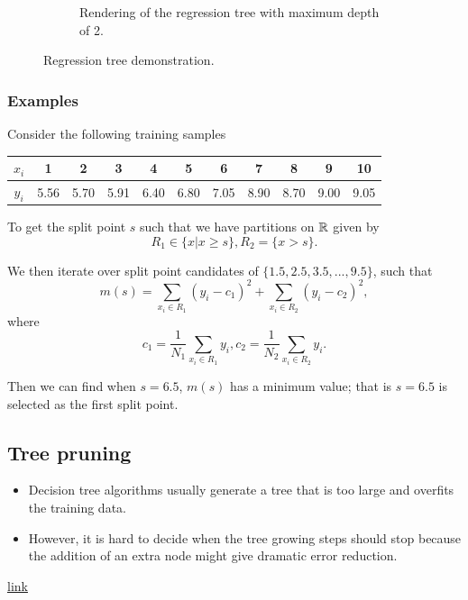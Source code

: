 \begin{refsection}
\begin{figure}[H]
\begin{subfigure}[t]{0.45\textwidth}
	\caption{Rendering of the regression tree with maximum depth of 2.}
\end{subfigure}
\caption{Regression tree demonstration.}
	\label{fig:decisiontreeregressionexample}
\end{figure}

\subsubsection{Examples}


\begin{example}
Consider the following training samples
\begin{tabular}{|c|c|c|c|c|c|c|c|c|c|c|}
	\hline 
	$x_i$ & 1 & 2 & 3 & 4 & 5 & 6 & 7 & 8 & 9 & 10 \\ 
	\hline 
	$y_i$ & 5.56 & 5.70 & 5.91 & 6.40 & 6.80 & 7.05 & 8.90 & 8.70 & 9.00 & 9.05 \\ 
	\hline 
\end{tabular} 	
To get the split point $s$ such that we have partitions on $\mathbb{R}$ given by
$$R_1\in \{x|x\geq s\}, R_2=\{x > s\}.$$

We then iterate over split point candidates of $\{1.5, 2.5, 3.5, ..., 9.5 \}$, such that
$$m(s) = \sum_{x_i\in R_1}(y_i - c_1)^2 + \sum_{x_i\in R_2}(y_i - c_2)^2,$$
where $$c_1 = \frac{1}{N_1}\sum_{x_i\in R_1}y_i, c_2 = \frac{1}{N_2}\sum_{x_i\in R_2}y_i. $$

Then we can find when $s = 6.5$, $m(s)$ has a minimum value; that is $s=6.5$ is selected as the first split point.
\end{example}

\subsection{Tree pruning}

\begin{remark}\hfill
\begin{itemize}
	\item Decision tree algorithms usually generate a tree that is too large and overfits the training data.
	\item However, it is hard to decide when the tree growing steps should stop because the addition of an extra node might give dramatic error reduction.
\end{itemize}	
	
\end{remark}

\href{http://faculty.cs.tamu.edu/ioerger/cs633-spr10/pruning.ppt}{link}


\end{refsection}
